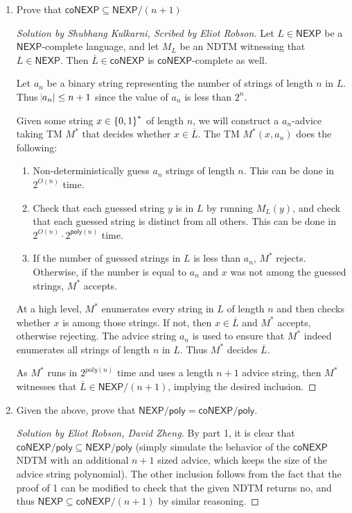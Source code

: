 \documentclass{article}
\newenvironment{solution}[1]{\begin{proof}[Solution by #1]}{\end{proof}}
\newenvironment{scribed}[2]{\begin{proof}[Solution by #1, Scribed by #2]}{\end{proof}}
\newcommand{\compliment}[1]{\overline{#1}}
\newcommand{\NEXP}{\mathsf{NEXP}}
\newcommand{\coNEXP}{\mathsf{coNEXP}}
\newcommand{\poly}{\mathsf{poly}}
\begin{document}
\begin{enumerate}
    \item Prove that \(\coNEXP \subseteq \NEXP / (n+1)\)
    
    \begin{scribed}{Shubhang Kulkarni}{Eliot Robson}
    	Let \(L \in \NEXP\) be a \(\NEXP\)-complete language, and let \(M_L\) be an NDTM witnessing that \(L \in \NEXP\). Then \(\compliment{L} \in \coNEXP\) is \(\coNEXP\)-complete as well.
    	
    	Let \(a_n\) be a binary string representing the number of strings of length \(n\) in \(L\). Thus \(\abs{a_n} \leq n+1\) since the value of \(a_n\) is less than \(2^{n}\).
    	
    	Given some string \(x \in \set{0,1}^*\) of length \(n\), we will construct a \(a_n\)-advice taking TM \(M^*\) that decides whether \(x \in \compliment{L}\). The TM \(M^*(x, a_n)\) does the following:
    	\begin{enumerate}
    		\item Non-deterministically guess \(a_n\) strings of length \(n\). This can be done in \(2^{O(n)}\) time.
    		
    		\item Check that each guessed string \(y\) is in \(L\) by running \(M_L(y)\), and check that each guessed string is distinct from all others. This can be done in \(2^{O(n)} \cdot 2^{\poly(n)}\) time.
    		
    		\item If the number of guessed strings in \(L\) is less than \(a_n\), \(M^*\) rejects. Otherwise, if the number is equal to \(a_n\) and \(x\) was not among the guessed strings, \(M^*\) accepts.
    	\end{enumerate}
    
    	At a high level, \(M^*\) enumerates every string in \(L\) of length \(n\) and then checks whether \(x\) is among those strings. If not, then \(x \in \compliment{L}\) and \(M^*\) accepts, otherwise rejecting. The advice string \(a_n\) is used to ensure that \(M^*\) indeed enumerates all strings of length \(n\) in \(L\). Thus \(M^*\) decides \(\compliment{L}\).
    	
    	As \(M^*\) runs in \(2^{poly(n)}\) time and uses a length \(n+1\) advice string, then \(M^*\) witnesses that \(\compliment{L} \in \NEXP / (n+1)\), implying the desired inclusion.
    \end{scribed}

    
    \item Given the above, prove that \(\NEXP / \poly = \coNEXP / \poly\).
    
    \begin{solution}{Eliot Robson, David Zheng}
        By part 1, it is clear that \(\coNEXP / \poly \subseteq \NEXP / \poly\) (simply simulate the behavior of the \(\coNEXP\) NDTM with an additional \(n+1\) sized advice, which keeps the size of the advice string polynomial). The other inclusion follows from the fact that the proof of 1 can be modified to check that the given NDTM returns no, and thus \(\NEXP \subseteq \coNEXP / (n+1)\) by similar reasoning. 
    \end{solution}
\end{enumerate}
\end{document}
